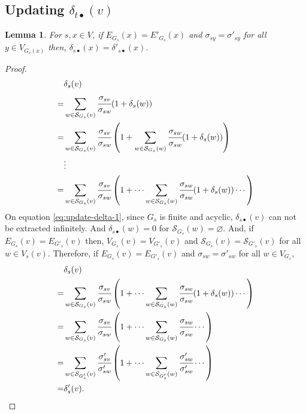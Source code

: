 \documentclass[twocolumn]{article}
\newtheorem{lemma}{Lemma}
\begin{document}
  \subsection*{Updating $\delta_{t\bullet}(v)$}
  \begin{lemma}
    \label{lm:update-delta-1}
    For $s,x\in V$, if $E_{G_s}(x)=E'_{G_s}(x)$ and $\sigma_{sy}=\sigma'_{sy}$ for all $y\in V_{G_s(x)}$ then, $\delta_{s\bullet}(x)=\delta'_{s\bullet}(x)$.
  \end{lemma}
  \begin{proof}
    \begin{align}
      &\delta_s(v)\nonumber\\
      =&\sum_{w\in\mathcal{S}_{G_s}(v)}\cfrac{\sigma_{sv}}{\sigma_{sw}}(1+\delta_s(w)) \nonumber\\
      =&\sum_{w\in\mathcal{S}_{G_s}(v)}\cfrac{\sigma_{sv}}{\sigma_{sw}}\left(1+
      \sum_{w\in\mathcal{S}_{G_s}(w)}\cfrac{\sigma_{sw}}{\sigma_{sw}}(1+\delta_s(w))
      \right) \nonumber\\
      &\vdots \nonumber\\
      =&\sum_{w\in\mathcal{S}_{G_s}(v)}\cfrac{\sigma_{sv}}{\sigma_{sw}}\left(1+\cdots
      \sum_{w\in\mathcal{S}_{G_s}(w)}\cfrac{\sigma_{sw}}{\sigma_{sw}}(1+\delta_s(w))
      \cdots\right)
      \label{eq:update-delta-1}
    \end{align}
    On equation \eqref{eq:update-delta-1}, since $G_s$ is finite and acyclic,
    $\delta_{s\bullet}(v)$ can not be extracted infinitely.
    And $\delta_{s\bullet}(w)=0$ for $\mathcal{S}_{G_s}(w)=\varnothing$.
    And, if $E_{G_s}(v)=E_{G'_s}(v)$ then, $V_{G_s}(v)=V_{G'_s}(v)$ and
    $\mathcal{S}_{G_s}(v)=\mathcal{S}_{G'_s}(v)$ for all $w\in V_s(v)$.
    Therefore, if $E_{G_s}(v)=E_{G'_s}(v)$ and $\sigma_{sw}=\sigma'_{sw}$ for all $w\in V_{G_s}$,
    \begin{equation*}
      \begin{aligned}
        &\delta_s(v) \\
        =&\sum_{w\in\mathcal{S}_{G_s}(v)}\cfrac{\sigma_{sv}}{\sigma_{sw}}\left(1+\cdots
        \sum_{w\in\mathcal{S}_{G_s}(w)}\cfrac{\sigma_{sw}}{\sigma_{sw}}(1+\delta_s(w))
        \cdots\right) \\
        =&\sum_{w\in\mathcal{S}_{G_s}(v)}\cfrac{\sigma_{sv}}{\sigma_{sw}}\left(1+\cdots
        \sum_{w\in\mathcal{S}_{G_s}(w)}\cfrac{\sigma_{sw}}{\sigma_{sw}}
        \cdots\right) \\
        =&\sum_{w\in\mathcal{S}_{G'_s}(v)}\cfrac{\sigma'_{sv}}{\sigma'_{sw}}\left(1+\cdots
        \sum_{w\in\mathcal{S}_{G'_s}(w)}\cfrac{\sigma'_{sw}}{\sigma'_{sw}}
        \cdots\right) \\
        =&\delta'_s(v).
      \end{aligned}
    \end{equation*}
  \end{proof}
\end{document}
